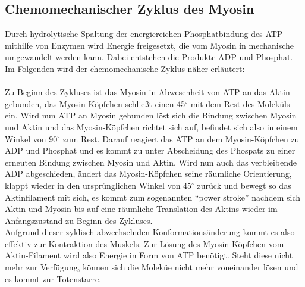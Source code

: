 \subsection{Chemomechanischer Zyklus des Myosin}
Durch hydrolytische Spaltung der energiereichen Phosphatbindung des ATP mithilfe von Enzymen wird Energie freigesetzt, die vom Myosin in mechanische umgewandelt werden kann. Dabei entstehen die Produkte ADP und Phosphat.\\
Im Folgenden wird der chemomechanische Zyklus näher erläutert:\\ 
\\
Zu Beginn des Zykluses ist das Myosin in Abwesenheit von ATP an das Aktin gebunden, das Myosin-Köpfchen schließt einen 45$^\circ$ mit dem Rest des Moleküls ein. 
Wird nun ATP an Myosin gebunden löst sich die Bindung zwischen Myosin und Aktin und das Myosin-Köpfchen richtet sich auf, befindet sich also in einem Winkel von $90^{\circ}$ zum Rest. Darauf reagiert das ATP an dem Myosin-Köpfchen zu ADP und Phosphat und es kommt zu unter Abscheidung des Phospats zu einer erneuten Bindung zwischen Myosin und Aktin. Wird nun auch das verbleibende ADP abgeschieden, ändert das Myosin-Köpfchen seine räumliche Orientierung, klappt wieder in den ursprünglichen Winkel von 45$^\circ$ zurück und bewegt so das Aktinfilament mit sich, es kommt zum sogenannten "`power stroke"' nachdem sich Aktin und Myosin bis auf eine räumliche Translation des Aktins wieder im Anfangszustand zu Beginn des Zykluses.\\
Aufgrund dieser zyklisch abwechselnden Konformationsänderung kommt es also effektiv zur Kontraktion des Muskels.
\noindent Zur Lösung des Myosin-Köpfchen vom Aktin-Filament wird also Energie in Form von ATP benötigt. Steht diese nicht mehr zur Verfügung, können sich die Moleküe nicht mehr voneinander lösen und es kommt zur Totenstarre.
